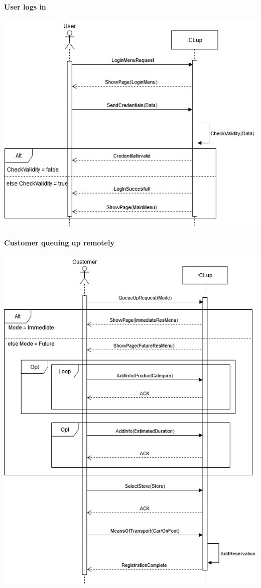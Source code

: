 \paragraph{User logs in}
\begin{flushleft}
	\includegraphics[scale=0.5]{Images/UseCase3Diagram.png}
\end{flushleft}

\paragraph{Customer queuing up remotely}
\begin{flushleft}
	\includegraphics[scale=0.5]{Images/UseCase4Diagram.png}
\end{flushleft}

